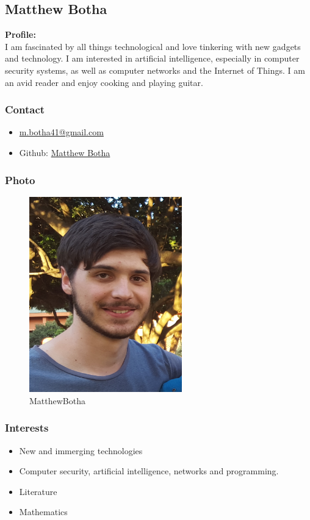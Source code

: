 \documentclass{article}
\begin{document}
	\newpage
	\subsection{Matthew Botha}
		\textbf{Profile:}\\
		I am fascinated by all things technological and love tinkering with new gadgets and technology. I am interested in artificial intelligence, especially in computer security systems, as well as computer networks and the Internet of Things. I am an avid reader and enjoy cooking and playing guitar.
		\subsubsection{Contact}
			\begin{itemize}
				\item \href{mailto:m.botha41@gmail.com}{m.botha41@gmail.com}
				\item Github: \href{https://github.com/MatthewBotha}{Matthew Botha}
			\end{itemize}
		\subsubsection{Photo}
		\begin{figure}[H]
			\centering
			\includegraphics[width=250px]{../Matt.jpg}
			\caption{MatthewBotha}
		\end{figure}
		\subsubsection{Interests}
		\begin{itemize}
			\item New and immerging technologies
			\item Computer security, artificial intelligence, networks and programming.
			\item Literature
			\item Mathematics
		\end{itemize}
		
\end{document}
